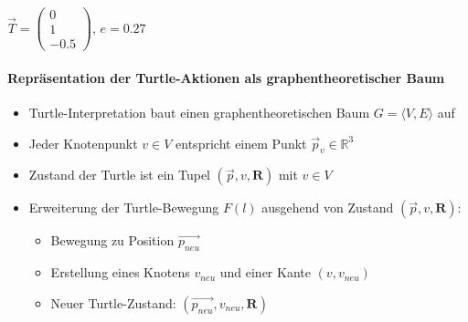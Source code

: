 \begin{center}
\begin{minipage}[c]{0.4\textwidth}
		$\overrightarrow{T} =\begin{pmatrix}
		0 \\ 1 \\ -0.5
		\end{pmatrix}$, $e = 0.27$
	\end{minipage}
\end{center}





\newpage
{}

\paragraph{Repräsentation der Turtle-Aktionen als graphentheoretischer Baum\\}

\begin{itemize}
	\item Turtle-Interpretation baut einen graphentheoretischen Baum $G=\langle V,E\rangle$ auf
	
	\item Jeder Knotenpunkt $v\in V$ entspricht einem Punkt $\overrightarrow{p}_v \in \mathbb{R}^3$
	
	\item Zustand der Turtle ist ein Tupel $(\overrightarrow{p}, v, \boldsymbol{R})$ mit $v\in V$ \\
	
	\item Erweiterung der Turtle-Bewegung \boldmath$F(l)$ ausgehend von Zustand $(\overrightarrow{p}, v, \boldsymbol{R})$:
	\begin{itemize}
		\item Bewegung zu Position $\overrightarrow{p_{neu}}$
		\item Erstellung eines Knotens $v_{neu}$ und einer Kante $(v, v_{neu})$
		\item Neuer Turtle-Zustand: $(\overrightarrow{p_{neu}}, v_{neu}, \boldsymbol{R})$
	\end{itemize}	
\end{itemize}

